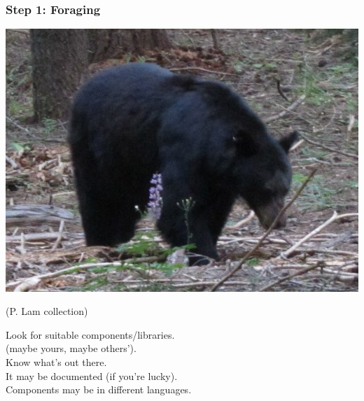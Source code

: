 \begin{frame}

\frametitle{Step 1: Foraging}

\begin{center}
\includegraphics[width=.4\textwidth]{images/0673_foraging}
\end{center}
{\tiny \hfill (P. Lam collection)}

\begin{changemargin}{1cm}
Look for suitable components/libraries.\\
\qquad (maybe yours, maybe others').\\
\qquad Know what's out there.\\[1em]

It may be documented (if you're lucky).\\[1em]

Components may be in different languages.

\end{changemargin}

\end{frame}

